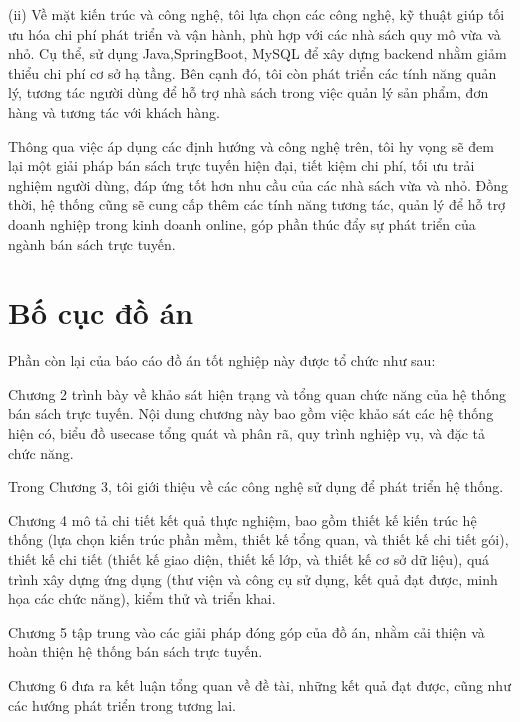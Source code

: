 \documentclass[../DoAn.tex]{subfiles}
\begin{document}
(ii) Về mặt kiến trúc và công nghệ, tôi lựa chọn các công nghệ, kỹ thuật giúp tối ưu hóa chi phí phát triển và vận hành, phù hợp với các nhà sách quy mô vừa và nhỏ. Cụ thể, sử dụng Java,SpringBoot, MySQL để xây dựng backend nhằm giảm thiểu chi phí cơ sở hạ tầng. Bên cạnh đó, tôi còn phát triển các tính năng quản lý, tương tác người dùng để hỗ trợ nhà sách trong việc quản lý sản phẩm, đơn hàng và tương tác với khách hàng.

Thông qua việc áp dụng các định hướng và công nghệ trên, tôi hy vọng sẽ đem lại một giải pháp bán sách trực tuyến hiện đại, tiết kiệm chi phí, tối ưu trải nghiệm người dùng, đáp ứng tốt hơn nhu cầu của các nhà sách vừa và nhỏ. Đồng thời, hệ thống cũng sẽ cung cấp thêm các tính năng tương tác, quản lý để hỗ trợ doanh nghiệp trong kinh doanh online, góp phần thúc đẩy sự phát triển của ngành bán sách trực tuyến.

\section{Bố cục đồ án}
\label{section:1.4}



Phần còn lại của báo cáo đồ án tốt nghiệp này được tổ chức như sau:

Chương 2 trình bày về khảo sát hiện trạng và tổng quan chức năng của hệ thống bán sách trực tuyến. Nội dung chương này bao gồm việc khảo sát các hệ thống hiện có, biểu đồ usecase tổng quát và phân rã, quy trình nghiệp vụ, và đặc tả chức năng.

Trong Chương 3, tôi giới thiệu về các công nghệ sử dụng để phát triển hệ thống. 

Chương 4 mô tả chi tiết kết quả thực nghiệm, bao gồm thiết kế kiến trúc hệ thống (lựa chọn kiến trúc phần mềm, thiết kế tổng quan, và thiết kế chi tiết gói), thiết kế chi tiết (thiết kế giao diện, thiết kế lớp, và thiết kế cơ sở dữ liệu), quá trình xây dựng ứng dụng (thư viện và công cụ sử dụng, kết quả đạt được, minh họa các chức năng), kiểm thử và triển khai.

Chương 5 tập trung vào các giải pháp đóng góp của đồ án, nhằm cải thiện và hoàn thiện hệ thống bán sách trực tuyến.

Chương 6 đưa ra kết luận tổng quan về đề tài, những kết quả đạt được, cũng như các hướng phát triển trong tương lai.
\end{document}
